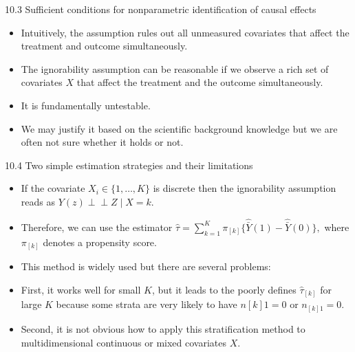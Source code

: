 \documentclass[aspectratio=169, 12pt]{beamer}
\begin{document}
\begin{frame}{10.3 Sufficient conditions for nonparametric identification of causal effects}
  \begin{itemize}
    \item Intuitively, the assumption rules out all unmeasured covariates that affect the treatment and outcome simultaneously.
    \item The ignorability assumption can be reasonable if we observe a rich set of covariates $X$ that affect the treatment and the outcome simultaneously.
    \item It is fundamentally untestable.
    \item We may justify it based on the scientific background knowledge but we are often not sure whether it holds or not.
  \end{itemize}
\end{frame}

\begin{frame}{10.4 Two simple estimation strategies and their limitations}
  \begin{itemize}
    \item If the covariate $X_i\in\{1,\dots,K\}$ is discrete then the ignorability assumption reads as $Y(z)\perp\!\!\!\perp Z\mid X=k$. 
    \item Therefore, we can use the estimator $\hat{\tau}=\sum_{k=1}^{K}\pi_{[k]}\{\hat{\bar{Y}}(1)-\hat{\bar{Y}}(0)\},$ where $\pi_{[k]}$ denotes a propensity score.
    \item This method is widely used but there are several problems: 
    \item First, it works well for small $K$, but it leads to the poorly defines $\hat{\tau}_{[k]}$ for large $K$ because some strata are very likely to have $n{[k]1}=0$ or $n_{[k]1}=0$.
    \item Second, it is not obvious how to apply this stratification method to multidimensional continuous or mixed covariates $X$.
  \end{itemize}
\end{frame}
\end{document}
